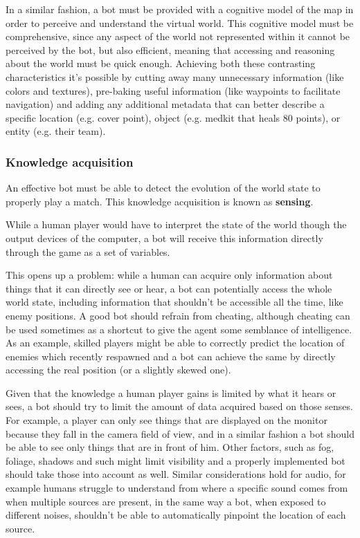 In a similar fashion, a bot must be provided with a cognitive model of the map in order to perceive and understand the virtual world. This cognitive model must be comprehensive, since any aspect of the world not represented within it cannot be perceived by the bot, but also efficient, meaning that accessing and reasoning about the world must be quick enough. Achieving both these contrasting characteristics it's possible by cutting away many unnecessary information (like colors and textures), pre-baking useful information (like waypoints to facilitate navigation) and adding any additional metadata that can better describe a specific location (e.g. cover point), object (e.g. medkit that heals 80 points), or entity (e.g. their team).

\subsubsection{Knowledge acquisition}
An effective bot must be able to detect the evolution of the world state to properly play a match. This knowledge acquisition is known as \textbf{sensing}. 

While a human player would have to interpret the state of the world though the output devices of the computer, a bot will receive this information directly through the game as a set of variables.

This opens up a problem: while a human can acquire only information about things that it can directly see or hear, a bot can potentially access the whole world state, including information that shouldn't be accessible all the time, like enemy positions. A good bot should refrain from cheating, although cheating can be used sometimes as a shortcut to give the agent some semblance of intelligence. As an example, skilled players might be able to correctly predict the location of enemies which recently respawned and a bot can achieve the same by directly accessing the real position (or a slightly skewed one). 

Given that the knowledge a human player gains is limited by what it hears or sees, a bot should try to limit the amount of data acquired based on those senses. For example, a player can only see things that are displayed on the monitor because they fall in the camera field of view, and in a similar fashion a bot should be able to see only things that are in front of him. Other factors, such as fog, foliage, shadows and such might limit visibility and a properly implemented bot should take those into account as well. Similar considerations hold for audio, for example humans struggle to understand from where a specific sound comes from when multiple sources are present, in the same way a bot, when exposed to different noises, shouldn't be able to automatically pinpoint the location of each source.

